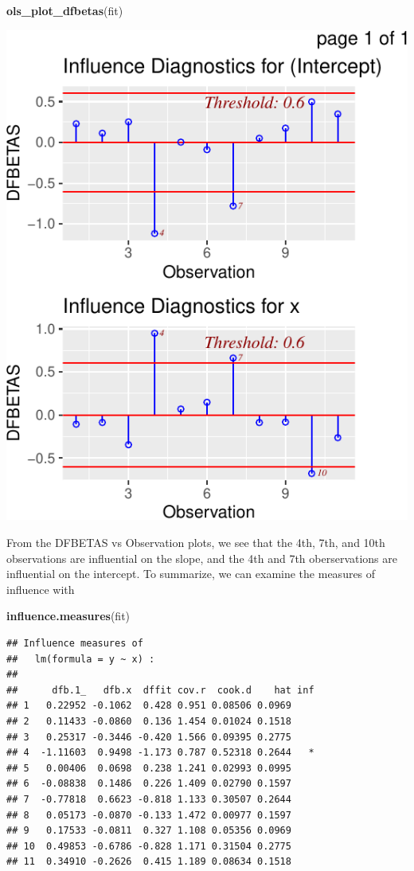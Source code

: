 \documentclass[
  11pt,
]{article}
\newenvironment{Shaded}{\begin{snugshade}}{\end{snugshade}}
\newcommand{\FunctionTok}[1]{\textcolor[rgb]{0.13,0.29,0.53}{\textbf{#1}}}
\newcommand{\NormalTok}[1]{#1}
\begin{document}
\begin{Shaded}
\begin{Highlighting}[]
\FunctionTok{ols\_plot\_dfbetas}\NormalTok{(fit)}
\end{Highlighting}
\end{Shaded}

\includegraphics{examples_files/figure-latex/unnamed-chunk-39-1.pdf}

From the DFBETAS vs Observation plots, we see that the 4th, 7th, and
10th observations are influential on the slope, and the 4th and 7th
oberservations are influential on the intercept. To summarize, we can
examine the measures of influence with

\begin{Shaded}
\begin{Highlighting}[]
\FunctionTok{influence.measures}\NormalTok{(fit)}
\end{Highlighting}
\end{Shaded}

\begin{verbatim}
## Influence measures of
##   lm(formula = y ~ x) :
## 
##      dfb.1_   dfb.x  dffit cov.r  cook.d    hat inf
## 1   0.22952 -0.1062  0.428 0.951 0.08506 0.0969    
## 2   0.11433 -0.0860  0.136 1.454 0.01024 0.1518    
## 3   0.25317 -0.3446 -0.420 1.566 0.09395 0.2775    
## 4  -1.11603  0.9498 -1.173 0.787 0.52318 0.2644   *
## 5   0.00406  0.0698  0.238 1.241 0.02993 0.0995    
## 6  -0.08838  0.1486  0.226 1.409 0.02790 0.1597    
## 7  -0.77818  0.6623 -0.818 1.133 0.30507 0.2644    
## 8   0.05173 -0.0870 -0.133 1.472 0.00977 0.1597    
## 9   0.17533 -0.0811  0.327 1.108 0.05356 0.0969    
## 10  0.49853 -0.6786 -0.828 1.171 0.31504 0.2775    
## 11  0.34910 -0.2626  0.415 1.189 0.08634 0.1518
\end{verbatim}
\end{document}
